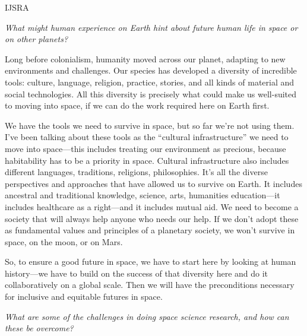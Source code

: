 \begin{labeling}{IJSRA}
	\item[IJSRA] \emph{What might human experience on Earth hint about future human life in space or on other planets?}

	\item[MO-R] Long before colonialism, humanity moved across our planet, adapting to new environments and challenges. Our species has developed a diversity of incredible tools: culture, language, religion, practice, stories, and all kinds of material and social technologies. All this diversity is precisely what could make us well-suited to moving into space, if we can do the work required here on Earth first.

	We have the tools we need to survive in space, but so far we’re not using them. I’ve been talking about these tools as the “cultural infrastructure” we need to move into space—this includes treating our environment as precious, because habitability has to be a priority in space. Cultural infrastructure also includes different languages, traditions, religions, philosophies. It’s all the diverse perspectives and approaches that have allowed us to survive on Earth. It includes ancestral and traditional knowledge, science, arts, humanities education—it includes healthcare as a right—and it includes mutual aid. We need to become a society that will always help anyone who needs our help. If we don’t adopt these as fundamental values and principles of a planetary society, we won’t survive in space, on the moon, or on Mars.

	So, to ensure a good future in space, we have to start here by looking at human history—we have to build on the success of that diversity here and do it collaboratively on a global scale. Then we will have the preconditions necessary for inclusive and equitable futures in space.

	\item[IJSRA] \emph{What are some of the challenges in doing space science research, and how can these be overcome?}


\end{labeling}
